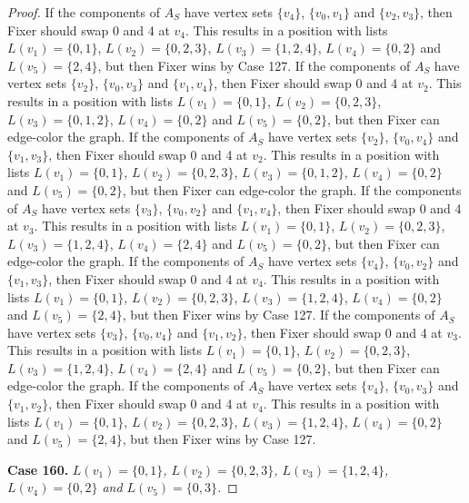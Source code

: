 \documentclass[12pt]{amsart}
\theoremstyle{plain}
\theoremstyle{definition}
\theoremstyle{remark}
\begin{document}
\begin{proof}
If the components of $A_S$ have vertex sets $\{v_4\}$, $\{v_0, v_1\}$ and $\{v_2, v_3\}$, then Fixer should swap 0 and 4 at $v_4$. This results in a position with lists $L(v_1) = \{0, 1\}$, $L(v_2) = \{0, 2, 3\}$, $L(v_3) = \{1, 2, 4\}$, $L(v_4) = \{0, 2\}$ and $L(v_5) = \{2, 4\}$, but then Fixer wins by Case 127.
If the components of $A_S$ have vertex sets $\{v_2\}$, $\{v_0, v_3\}$ and $\{v_1, v_4\}$, then Fixer should swap 0 and 4 at $v_2$. This results in a position with lists $L(v_1) = \{0, 1\}$, $L(v_2) = \{0, 2, 3\}$, $L(v_3) = \{0, 1, 2\}$, $L(v_4) = \{0, 2\}$ and $L(v_5) = \{0, 2\}$, but then Fixer can edge-color the graph.
If the components of $A_S$ have vertex sets $\{v_2\}$, $\{v_0, v_4\}$ and $\{v_1, v_3\}$, then Fixer should swap 0 and 4 at $v_2$. This results in a position with lists $L(v_1) = \{0, 1\}$, $L(v_2) = \{0, 2, 3\}$, $L(v_3) = \{0, 1, 2\}$, $L(v_4) = \{0, 2\}$ and $L(v_5) = \{0, 2\}$, but then Fixer can edge-color the graph.
If the components of $A_S$ have vertex sets $\{v_3\}$, $\{v_0, v_2\}$ and $\{v_1, v_4\}$, then Fixer should swap 0 and 4 at $v_3$. This results in a position with lists $L(v_1) = \{0, 1\}$, $L(v_2) = \{0, 2, 3\}$, $L(v_3) = \{1, 2, 4\}$, $L(v_4) = \{2, 4\}$ and $L(v_5) = \{0, 2\}$, but then Fixer can edge-color the graph.
If the components of $A_S$ have vertex sets $\{v_4\}$, $\{v_0, v_2\}$ and $\{v_1, v_3\}$, then Fixer should swap 0 and 4 at $v_4$. This results in a position with lists $L(v_1) = \{0, 1\}$, $L(v_2) = \{0, 2, 3\}$, $L(v_3) = \{1, 2, 4\}$, $L(v_4) = \{0, 2\}$ and $L(v_5) = \{2, 4\}$, but then Fixer wins by Case 127.
If the components of $A_S$ have vertex sets $\{v_3\}$, $\{v_0, v_4\}$ and $\{v_1, v_2\}$, then Fixer should swap 0 and 4 at $v_3$. This results in a position with lists $L(v_1) = \{0, 1\}$, $L(v_2) = \{0, 2, 3\}$, $L(v_3) = \{1, 2, 4\}$, $L(v_4) = \{2, 4\}$ and $L(v_5) = \{0, 2\}$, but then Fixer can edge-color the graph.
If the components of $A_S$ have vertex sets $\{v_4\}$, $\{v_0, v_3\}$ and $\{v_1, v_2\}$, then Fixer should swap 0 and 4 at $v_4$. This results in a position with lists $L(v_1) = \{0, 1\}$, $L(v_2) = \{0, 2, 3\}$, $L(v_3) = \{1, 2, 4\}$, $L(v_4) = \{0, 2\}$ and $L(v_5) = \{2, 4\}$, but then Fixer wins by Case 127.

\noindent\textbf{Case 160.  }\textit{$L(v_1) = \{0, 1\}$, $L(v_2) = \{0, 2, 3\}$, $L(v_3) = \{1, 2, 4\}$, $L(v_4) = \{0, 2\}$ and $L(v_5) = \{0, 3\}$.}


\end{proof}
\end{document}
